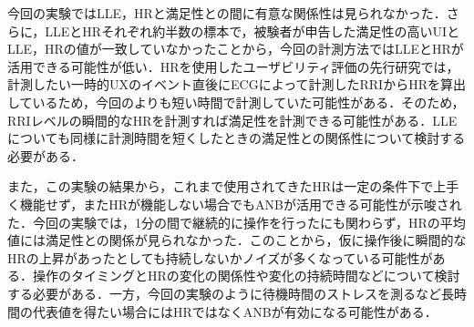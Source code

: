 今回の実験ではLLE，HRと満足性との間に有意な関係性は見られなかった．さらに，LLEとHRそれぞれ約半数の標本で，被験者が申告した満足性の高いUIとLLE，HRの値が一致していなかったことから，今回の計測方法ではLLEとHRが活用できる可能性が低い．HRを使用したユーザビリティ評価の先行研究\cite{trimmel2003stress}では，計測したい一時的UXのイベント直後にECGによって計測したRRIからHRを算出しているため，今回のよりも短い時間で計測していた可能性がある．そのため，RRIレベルの瞬間的なHRを計測すれば満足性を計測できる可能性がある．LLEについても同様に計測時間を短くしたときの満足性との関係性について検討する必要がある．

また，この実験の結果から，これまで使用されてきたHRは一定の条件下で上手く機能せず，またHRが機能しない場合でもANBが活用できる可能性が示唆された．今回の実験では，1分の間で継続的に操作を行ったにも関わらず，HRの平均値には満足性との関係が見られなかった．このことから，仮に操作後に瞬間的なHRの上昇があったとしても持続しないかノイズが多くなっている可能性がある．操作のタイミングとHRの変化の関係性や変化の持続時間などについて検討する必要がある．一方，今回の実験のように待機時間のストレスを測るなど長時間の代表値を得たい場合にはHRではなくANBが有効になる可能性がある．



